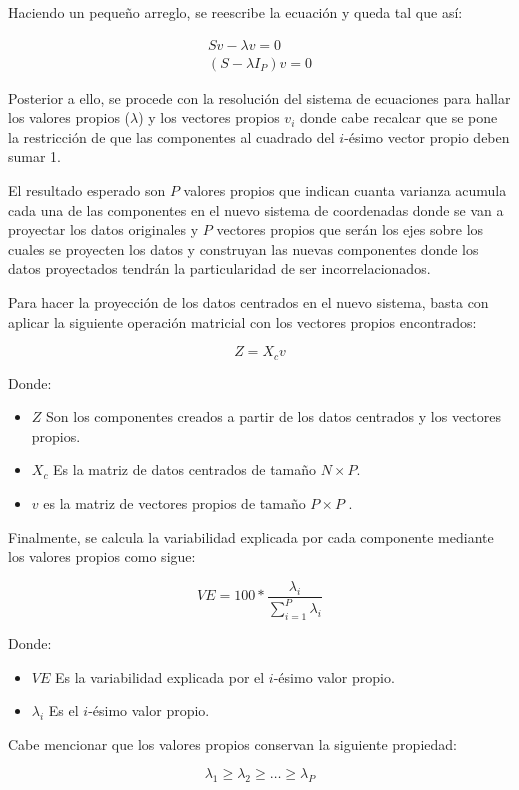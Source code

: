 \documentclass[11pt, letterpaper]{article}
\begin{document}
Haciendo un pequeño arreglo, se reescribe la ecuación y queda tal que así:

$$
\begin{matrix}
Sv-\lambda v = 0 \\
(S-\lambda I_P)v = 0	
\end{matrix}
$$

Posterior a ello, se procede con la resolución del sistema de ecuaciones para hallar los valores propios ($\lambda$) y los vectores propios $v_i$ donde cabe recalcar que se pone la restricción de que las componentes al cuadrado del $i$-ésimo vector propio deben sumar 1.

El resultado esperado son $P$ valores propios que indican cuanta varianza acumula cada una de las componentes en el nuevo sistema de coordenadas donde se van a proyectar los datos originales y $P$ vectores propios que serán los ejes sobre los cuales se proyecten los datos y construyan las nuevas componentes donde los datos proyectados tendrán la particularidad de ser incorrelacionados.

Para hacer la proyección de los datos centrados en el nuevo sistema, basta con aplicar la siguiente operación matricial con los vectores propios encontrados:

$$Z = X_cv$$

Donde: 
\begin{itemize}
	\item $Z$ Son los componentes creados a partir de los datos centrados y los vectores propios.
	\item $X_c$ Es la matriz de datos centrados de tamaño $N \times P$.
	\item $v$ es la matriz de vectores propios de tamaño $P \times P$ .
\end{itemize}

Finalmente, se calcula la variabilidad explicada por cada componente mediante los valores propios como sigue:

$$VE = 100*\frac{\lambda_i}{\sum_{i = 1}^P{\lambda_i}}$$

Donde: 
\begin{itemize}
	\item $VE$ Es la variabilidad explicada por el $i$-ésimo valor propio.
	\item $\lambda_i$ Es el $i$-ésimo valor propio.
\end{itemize}

Cabe mencionar que los valores propios conservan la siguiente propiedad:

$$\lambda_1 \geq \lambda_2 \geq \dots \geq \lambda_P$$
\end{document}
